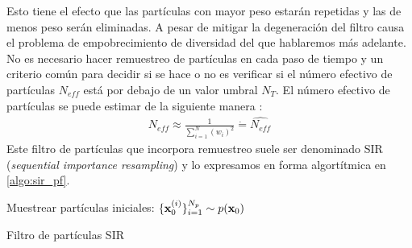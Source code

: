 Esto tiene el efecto que las partículas con mayor peso estarán repetidas y las de menos peso serán eliminadas. A pesar de mitigar la degeneración del filtro causa el problema de empobrecimiento de diversidad del que hablaremos más adelante. No es necesario hacer remuestreo de partículas en cada paso de tiempo y un criterio común para decidir si se hace o no es verificar si el número efectivo de partículas $N_{eff}$ está por debajo de un valor umbral $N_T$. El número efectivo de partículas se puede estimar de la siguiente manera \cite{Arulampalam2002}:
\begin{align*}
    N_{eff} \approx \frac{1}{\sum_{i=1}^N (w_i)^2} \dot{=} \widehat{N_{eff}}
\end{align*}
Este filtro de partículas que incorpora remuestreo suele ser denominado SIR (\textit{sequential importance resampling}) y lo expresamos en forma algortítmica en \ref{algo:sir_pf}.

\begin{algorithm}[H]\label{algo:sir_pf}    
    Muestrear partículas iniciales: $\{\mathbf{x}_0^{(i)}\}_{i=1}^{N_p} \sim p(\mathbf{x}_0)$
    
\caption{Filtro de partículas SIR}
\end{algorithm}

